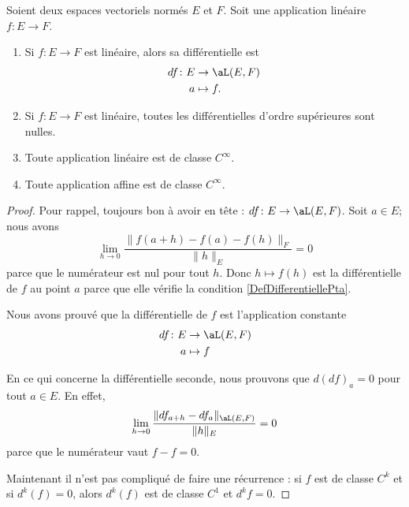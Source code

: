 \begin{lemma}       \label{LEMooZSNMooCfjzOB}
	Soient deux espaces vectoriels normés \( E\) et \( F\). Soit une application linéaire \( f\colon E\to F\).
	\begin{enumerate}
		\item
		      Si \( f\colon E\to F\) est linéaire, alors sa différentielle est
		      \begin{equation}
			      \begin{aligned}
				      df\colon E & \to  \aL(E,F) \\
				      a          & \mapsto f.
			      \end{aligned}
		      \end{equation}
		\item
		      Si \( f\colon E\to F\) est linéaire, toutes les différentielles d'ordre supérieures sont nulles.
		\item
		      Toute application linéaire est de classe \(  C^{\infty}\).
		\item
		      Toute application affine est de classe \(  C^{\infty}\).
	\end{enumerate}
\end{lemma}

\begin{proof}
	Pour rappel, toujours bon à avoir en tête : \( df\colon E\to \aL(E,F)\). Soit \( a\in E\); nous avons
	\begin{equation}
		\lim_{h\to 0} \frac{ \| f(a+h)-f(a)- f(h) \|_F }{ \| h \|_E }=0
	\end{equation}
	parce que le numérateur est nul pour tout \( h\). Donc \( h\mapsto f(h)\) est la différentielle de \( f\) au point \( a\) parce que elle vérifie la condition \eqref{DefDifferentiellePta}.

	Nous avons prouvé que la différentielle de \( f\) est l'application constante
	\begin{equation}
		\begin{aligned}
			df\colon E & \to \aL(E,F) \\
			a          & \mapsto f
		\end{aligned}
	\end{equation}

	En ce qui concerne la différentielle seconde, nous prouvons que \( d(df)_a=0\) pour tout \( a\in E\). En effet,
	\begin{equation}
		\lim_{h\to 0} \frac{ \| df_{a+h}-df_a \|_{\aL(E,F)} }{ \| h \|_E }=0
	\end{equation}
	parce que le numérateur vaut \( f-f=0\).

	Maintenant il n'est pas compliqué de faire une récurrence : si \( f\) est de classe \( C^k\) et si \( d^k(f)=0\), alors \( d^k(f)\) est de classe \( C^1\) et \( d^kf=0\).
\end{proof}

